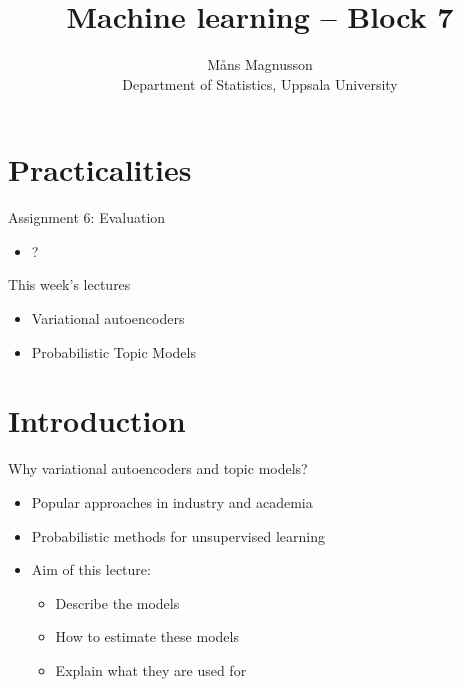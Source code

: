 \documentclass[10pt]{beamer}
\title[]{{\color{black}Machine learning -- Block 7}}
\author[]{M{\aa}ns Magnusson\\Department of Statistics, Uppsala University}
\date{\currentsemester}
\begin{document}
\frame{\titlepage
}


\section{Practicalities}

\begin{frame}{Assignment 6: Evaluation}

\begin{itemize}
\item ?
\end{itemize}

\end{frame}



\begin{frame}{This week's lectures}
\begin{itemize}
\item Variational autoencoders
\item Probabilistic Topic Models
\end{itemize}
\end{frame}



\section{Introduction}
\frame{\sectionpage}

\begin{frame}{Why variational autoencoders and topic models?}
\begin{itemize}
\item Popular approaches in {\color{uured}industry and academia}
\item {\color{uured}Probabilistic} methods for unsupervised learning\pause
\item {\color{uured}Aim} of this lecture:
\begin{itemize}
\item Describe the models
\item How to estimate these models
\item Explain what they are used for
\end{itemize}
\end{itemize}
\end{frame}
\end{document}

